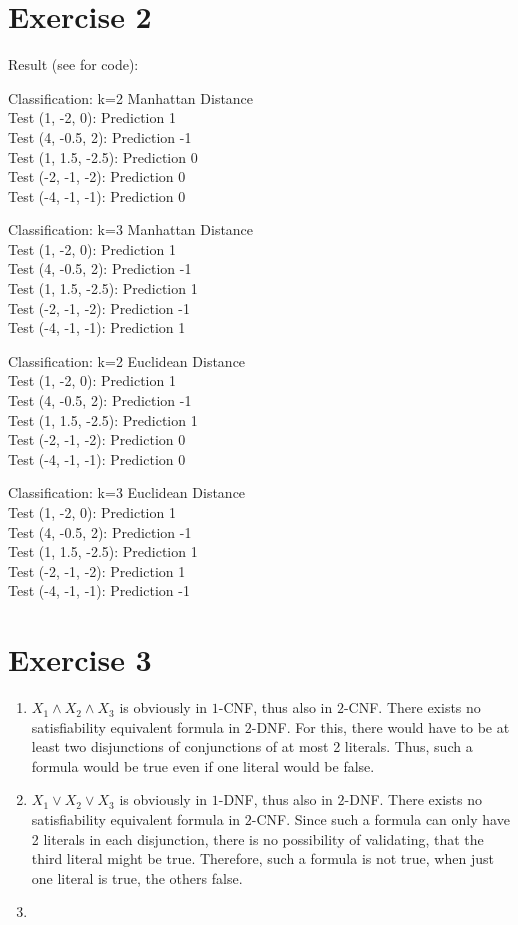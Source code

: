 \documentclass[12pt]{article}
\begin{document}
\pagebreak
\section*{Exercise 2}
Result (see  for code):
\bigskip

Classification: k=2 Manhattan Distance \\
Test (1, -2, 0): Prediction 1 \\
Test (4, -0.5, 2): Prediction -1 \\
Test (1, 1.5, -2.5): Prediction 0 \\
Test (-2, -1, -2): Prediction 0 \\
Test (-4, -1, -1): Prediction 0
\bigskip

Classification: k=3 Manhattan Distance \\
Test (1, -2, 0): Prediction 1 \\
Test (4, -0.5, 2): Prediction -1 \\
Test (1, 1.5, -2.5): Prediction 1 \\
Test (-2, -1, -2): Prediction -1 \\
Test (-4, -1, -1): Prediction 1
\bigskip

Classification: k=2 Euclidean Distance \\
Test (1, -2, 0): Prediction 1 \\
Test (4, -0.5, 2): Prediction -1 \\
Test (1, 1.5, -2.5): Prediction 1 \\
Test (-2, -1, -2): Prediction 0 \\
Test (-4, -1, -1): Prediction 0
\bigskip

Classification: k=3 Euclidean Distance \\
Test (1, -2, 0): Prediction 1 \\
Test (4, -0.5, 2): Prediction -1 \\
Test (1, 1.5, -2.5): Prediction 1 \\
Test (-2, -1, -2): Prediction 1 \\
Test (-4, -1, -1): Prediction -1
\bigskip

\section*{Exercise 3}
\begin{enumerate}[label=(\alph*)]
	\item	$X_1 \land X_2 \land X_3$ is obviously in $1$-CNF, thus also in $2$-CNF. There exists no satisfiability equivalent formula in $2$-DNF. For this, there would have to be at least two disjunctions of conjunctions of at most 2 literals. Thus, such a formula would be true even if one literal would be false.
	\item	$X_1 \lor X_2 \lor X_3$ is obviously in $1$-DNF, thus also in $2$-DNF. There exists no satisfiability equivalent formula in $2$-CNF. Since such a formula can only have 2 literals in each disjunction, there is no possibility of validating, that the third literal might be true. Therefore, such a formula is not true, when just one literal is true, the others false.
	\item
\end{enumerate}
\end{document}
